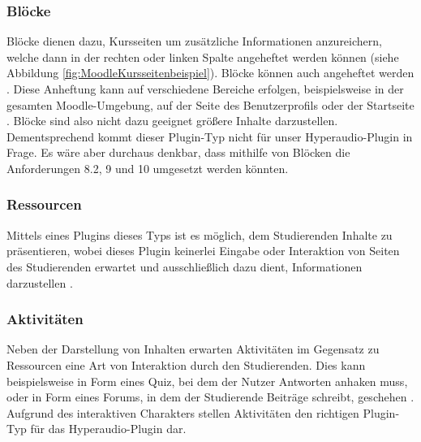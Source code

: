 
\subsubsection{Blöcke}
Blöcke dienen dazu, Kursseiten um zusätzliche Informationen anzureichern, welche dann in der rechten oder linken Spalte angeheftet werden können (siehe Abbildung \ref{fig:MoodleKursseitenbeispiel}). Blöcke können auch \glqq angeheftet\grqq{} werden \citep{moodle2018blocks}. Diese Anheftung kann auf verschiedene Bereiche erfolgen, beispielsweise in der gesamten Moodle-Umgebung, auf der Seite des Benutzerprofils oder der Startseite \citep{moodle2015blocksettings}. Blöcke sind also nicht dazu geeignet größere Inhalte darzustellen. Dementsprechend kommt dieser Plugin-Typ nicht für unser Hyperaudio-Plugin in Frage. Es wäre aber durchaus denkbar, dass mithilfe von Blöcken die Anforderungen 8.2, 9 und 10 umgesetzt werden könnten.  


\subsubsection{Ressourcen}
Mittels eines Plugins dieses Typs ist es möglich, dem Studierenden Inhalte zu präsentieren, wobei dieses Plugin keinerlei Eingabe oder Interaktion von Seiten des Studierenden erwartet und ausschließlich dazu dient, Informationen darzustellen \citep{wild2017moodle}.


\subsubsection{Aktivitäten}
Neben der Darstellung von Inhalten erwarten Aktivitäten im Gegensatz zu Ressourcen eine Art von Interaktion durch den Studierenden. Dies kann beispielsweise in Form eines Quiz, bei dem der Nutzer Antworten anhaken muss, oder in Form eines Forums, in dem der Studierende Beiträge schreibt, geschehen \citep{wild2017moodle}. Aufgrund des interaktiven Charakters stellen Aktivitäten den richtigen Plugin-Typ für das Hyperaudio-Plugin dar.


